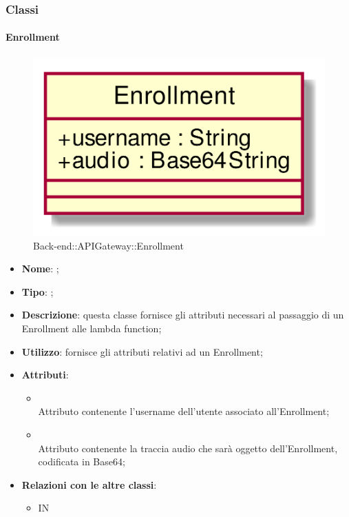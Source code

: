 \subsubsection{Classi}
\hypertarget{Enrollment_label}{\paragraph{Enrollment}}
\begin{figure}[h]
	\centering
	\includegraphics[width=\textwidth,height=\textheight,keepaspectratio]{images/ClassEnrollment.png}
	\caption{Back-end::APIGateway::Enrollment}
\end{figure}
\begin{itemize}
	\item \textbf{Nome}: ;
	\item \textbf{Tipo}: ;
	\item \textbf{Descrizione}: questa classe fornisce gli attributi necessari al passaggio di un Enrollment alle lambda function;
	\item \textbf{Utilizzo}: fornisce gli attributi relativi ad un Enrollment;
	\item \textbf{Attributi}:
	\begin{itemize}
		\item[]  \\
		Attributo contenente l'username dell'utente associato all'Enrollment;
		\item[]  \\
		Attributo contenente la traccia audio che sarà oggetto dell'Enrollment, codificata in Base64;
	\end{itemize}
	\item \textbf{Relazioni con le altre classi}:
	\begin{itemize}
		\item IN \hyperlink{VocalAPI_label}{}
	\end{itemize}
\end{itemize}
\FloatBarrier

